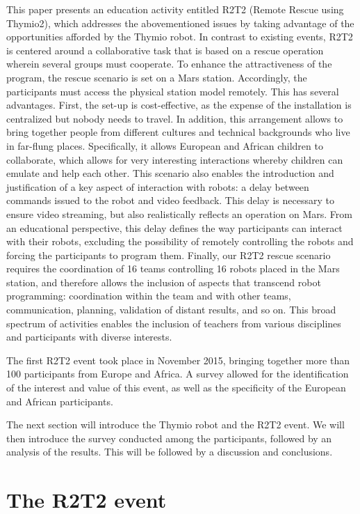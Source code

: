 \documentclass{intech-journal}
\begin{document}
This paper presents an education activity entitled R2T2 (Remote Rescue using Thymio2), which addresses the abovementioned issues by taking advantage of the opportunities afforded by the Thymio robot. 
In contrast to existing events, R2T2 is centered around a collaborative task that is based on a rescue operation wherein several groups must cooperate.
To enhance the attractiveness of the program, the rescue scenario is set on a Mars station. 
Accordingly, the participants must access the physical station model remotely.
This has several advantages. 
First, the set-up is cost-effective, as the expense of the installation is centralized but nobody needs to travel.
In addition, this arrangement allows to bring together people from different cultures and technical backgrounds who live in far-flung places. 
Specifically, it allows European and African children to collaborate, which allows for very interesting interactions whereby children can emulate and help each other.
This scenario also enables the introduction and justification of a key aspect of interaction with robots: a delay between commands issued to the robot and video feedback. 
This delay is necessary to ensure video streaming, but also realistically reflects an operation on Mars.
From an educational perspective, this delay defines the way participants can interact with their robots, excluding the possibility of remotely controlling the robots and forcing the participants to program them.
Finally, our R2T2 rescue scenario requires the coordination of 16 teams controlling 16 robots placed in the Mars station, and therefore allows the inclusion of aspects that transcend robot programming: coordination within the team and with other teams, communication, planning, validation of distant results, and so on.
This broad spectrum of activities enables the inclusion of teachers from various disciplines and participants with diverse interests.

The first R2T2 event took place in November 2015, bringing together more than 100 participants from Europe and Africa. 
A survey allowed for the identification of the interest and value of this event, as well as the specificity of the European and African participants.

The next section will introduce the Thymio robot and the R2T2 event. 
We will then introduce the survey conducted among the participants, followed by an analysis of the results. 
This will be followed by a discussion and conclusions.


\section{The R2T2 event}
\end{document}
